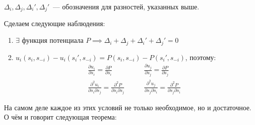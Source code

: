 \begin{df}
  $\Delta_i, \Delta_j, \Delta_i', \Delta_j'$~--- обозначения для разностей, указанных выше.
\end{df}

\begin{remrk}
  Сделаем следующие наблюдения: 
  \begin{enumerate}
    \item $\exists$ функция потенциала $P \implies \Delta_i + \Delta_j + \Delta_i' + \Delta_j' = 0$  
    \item $u_i(s_i, s_{-i}) - u_i(s_i', s_{-i}) = P(s_i, s_{-i}) - P(s_i', s_{-i}) $,
      поэтому: 
      \begin{align*}
	\frac{\partial u_i}{\partial s_i} = \frac{\partial P}{\partial s_i} \quad&\quad \frac{\partial u_j}{\partial s_j} = \frac{\partial P}{\partial s_j} \\
	\frac{\partial^2 u_i}{\partial s_i \partial s_j} = \frac{\partial^2 P}{\partial s_i \partial s_j} \quad&\quad \frac{\partial^2 u_j}{\partial s_j \partial s_i} = \frac{\partial^2 P}{\partial s_j \partial s_i}
\end{align*}
  \end{enumerate}

  На самом деле каждое из этих условий не только необходимое, но и достаточное. О чём и говорит следующая теорема:
\end{remrk}

